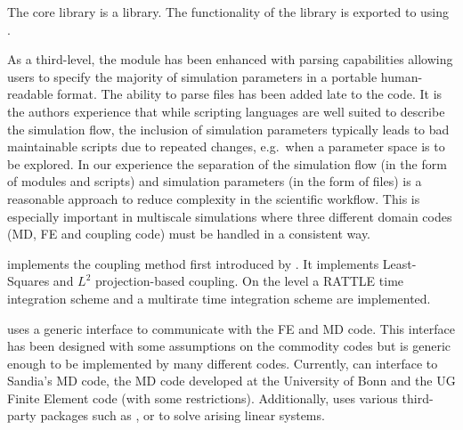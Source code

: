 
The core \MACI library is a \CPP library. The functionality of the library is exported to \PYTHON using \SWIG.

As a third-level, the \PYTHON module has been enhanced with \XML parsing capabilities allowing users to specify the majority of simulation parameters in a portable human-readable format. The ability to parse \XML files has been added late to the code. It is the authors experience that while scripting languages are well suited to describe the simulation flow, the inclusion of simulation parameters typically leads to bad maintainable scripts due to repeated changes, e.g.~when a parameter space is to be explored. In our experience the separation of the simulation flow (in the form of \PYTHON modules and scripts) and simulation parameters (in the form of \XML files) is a reasonable approach to reduce complexity in the scientific workflow. This is especially important in multiscale simulations where three different domain codes (MD, FE and coupling code) must be handled in a consistent way.

\MACI implements the coupling method first introduced by \citet{FackeldeyKrauseKrauseLenzen2011}. It implements Least-Squares and $L^2$ projection-based coupling. On the \PYTHON level a RATTLE time integration scheme and a multirate time integration scheme are implemented. 

\MACI uses a generic interface to communicate with the FE and MD code. This interface has been designed with some assumptions on the commodity codes but is generic enough to be implemented by many different codes. Currently, \MACI can interface to Sandia's \LAMMPS MD code, the \TREMOLO MD code developed at the University of Bonn and the UG Finite Element code (with some restrictions). Additionally, \MACI uses various third-party packages such as \TRILINOS, \PETSC or \UMFPACK to solve arising linear systems. 

